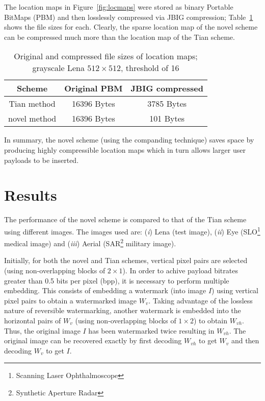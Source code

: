 \documentclass[10pt,twocolumn,letterpaper]{article}
\begin{document}
{The location maps in Figure~\ref{fig:locmaps} were stored as binary Portable BitMaps (PBM) and then losslessly compressed 
via JBIG compression; Table~\ref{tab:locmaps} shows the file sizes for each.
Clearly, the sparse location map of the novel scheme can be compressed much more 
than the location map of the Tian scheme.  
\begin{table}[!ht]
\setlength{\abovecaptionskip}{-0.25cm}
\begin{center}
\begin{tabular}{|c|c|c|} \hline
Scheme 		& Original PBM 	& JBIG compressed \\ \hline \hline
Tian method 	& 16396 Bytes	& 3785 Bytes \\ \hline 
novel method 	& 16396 Bytes	& 101 Bytes \\ \hline 
\end{tabular}
\caption{Original and compressed file sizes of location maps; grayscale Lena $512\times 512$, threshold of 16}
\label{tab:locmaps}
\end{center}
\setlength{\abovecaptionskip}{0cm}
\end{table}

\vspace{-1.25cm}
In summary, the novel scheme (using the companding technique) saves space by producing highly compressible 
location maps which in turn allows larger user payloads to be inserted.

\section{Results}
\label{sec:results}
The performance of the novel scheme is compared to that of the Tian scheme using different images.
The images used are: (\emph{i}) Lena (test image), (\emph{ii}) Eye (SLO\footnote{Scanning Laser Ophthalmoscope} medical image) 
and (\emph{iii}) Aerial (SAR\footnote{Synthetic Aperture Radar} military image). 

Initially, for both the novel and Tian schemes, 
vertical pixel pairs are selected (using non-overlapping blocks of $2\times 1$).
In order to achive payload bitrates greater than 0.5 bits per pixel (bpp), 
it is necessary to perform multiple embedding.
This consists of embedding a watermark (into image $I$) using vertical pixel pairs to obtain a watermarked image $W_{v}$.
Taking advantage of the lossless nature of reversible watermarking, another watermark is embedded
into the horizontal pairs of $W_{v}$ (using non-overlapping blocks of $1\times 2$) to obtain $W_{vh}$.
Thus, the original image $I$ has been watermarked twice resulting in $W_{vh}$.
The original image can be recovered exactly by first decoding $W_{vh}$ to get $W_{v}$ and then
decoding $W_{v}$ to get $I$.



}
\end{document}
